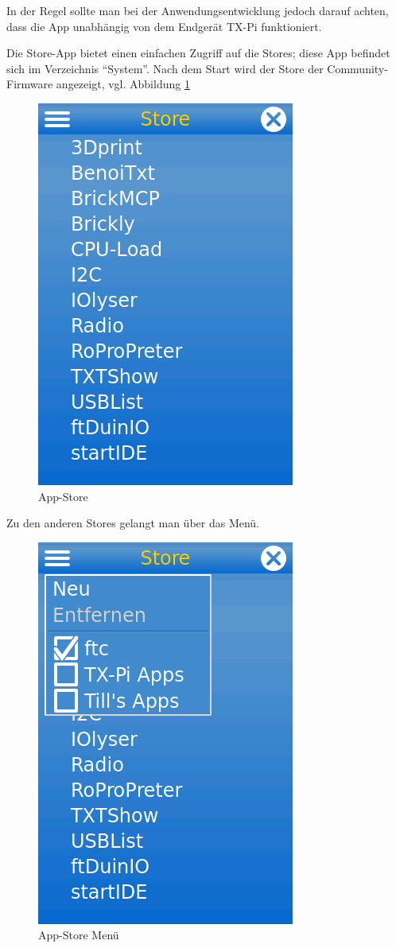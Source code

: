 \documentclass[
  paper=A4,
  ngerman,
  fontsize=12pt,
  parskip=half-,
]{scrbook}
\begin{document}
In der Regel sollte man bei der Anwendungsentwicklung jedoch
darauf achten, dass die App unabhängig von dem Endgerät TX-Pi
funktioniert.

Die Store-App bietet einen einfachen Zugriff auf die Stores; diese
App befindet sich im Verzeichnis "`System"'. Nach dem Start wird
der Store der Community-Firmware angezeigt, vgl. Abbildung \ref{img:store}

\begin{figure}[ht]
\centering
\includegraphics[scale=0.4]{images/store.png}
\caption{App-Store}
\label{img:store}
\end{figure}


Zu den anderen Stores gelangt man über das Menü. 

\begin{figure}[ht]
\centering
\includegraphics[scale=0.4]{images/store-menu.png}
\caption{App-Store Menü}
\end{figure}
\end{document}
